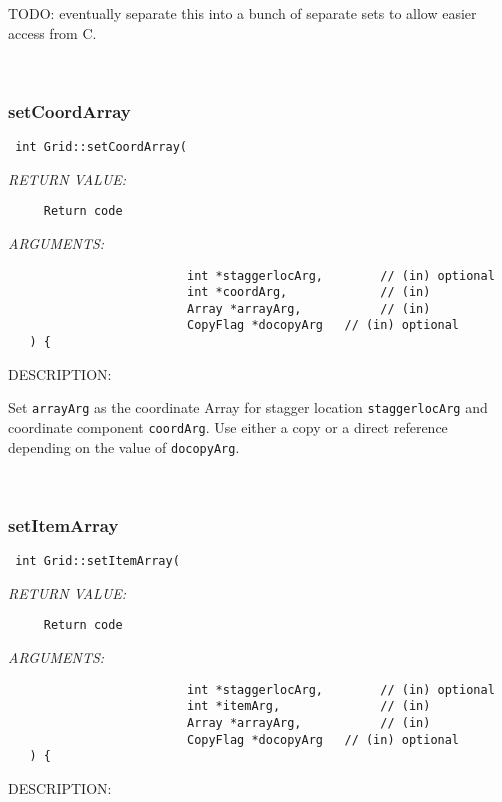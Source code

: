      TODO: eventually separate this into a bunch of separate sets to allow 
           easier access from C. 
 
\mbox{}\hrulefill\ 
 
\subsubsection [setCoordArray] {setCoordArray}


  
\begin{verbatim} int Grid::setCoordArray(
 \end{verbatim}{\em RETURN VALUE:}
\begin{verbatim}     Return code\end{verbatim}{\em ARGUMENTS:}
\begin{verbatim}                         int *staggerlocArg,        // (in) optional
                         int *coordArg,             // (in) 
                         Array *arrayArg,           // (in)
                         CopyFlag *docopyArg   // (in) optional
   ) {\end{verbatim}
{\sf DESCRIPTION:\\ }


      Set {\tt arrayArg} as the coordinate Array for stagger location 
   {\tt staggerlocArg} and coordinate component {\tt coordArg}. Use either
   a copy or a direct reference depending on the value of {\tt docopyArg}. 
 
\mbox{}\hrulefill\ 
 
\subsubsection [setItemArray] {setItemArray}


  
\begin{verbatim} int Grid::setItemArray(
 \end{verbatim}{\em RETURN VALUE:}
\begin{verbatim}     Return code\end{verbatim}{\em ARGUMENTS:}
\begin{verbatim}                         int *staggerlocArg,        // (in) optional
                         int *itemArg,              // (in)
                         Array *arrayArg,           // (in)
                         CopyFlag *docopyArg   // (in) optional
   ) {\end{verbatim}
{\sf DESCRIPTION:\\ }


